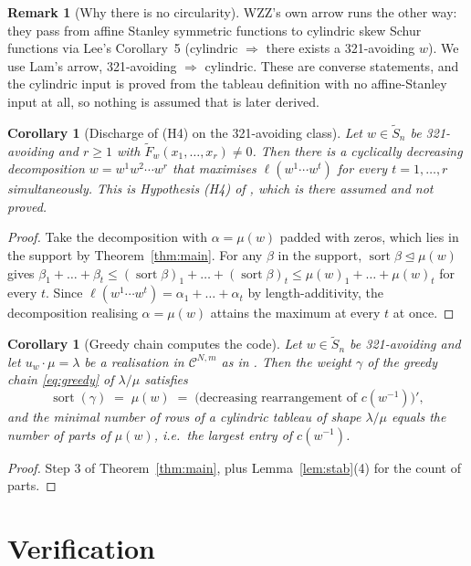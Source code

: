 \documentclass[11pt]{article}
\theoremstyle{plain}
\newtheorem{cor}[thm]{Corollary}
\theoremstyle{definition}
\newtheorem{rem}[thm]{Remark}
\DeclareMathOperator{\sort}{sort}
\newcommand{\Saff}{\widetilde{S}_{n}}
\newcommand{\Fw}{\widetilde{F}_{w}}
\newcommand{\cyl}{\mathcal{C}}
\begin{document}
\begin{rem}[Why there is no circularity]
WZZ's own arrow runs the other way: they pass from affine Stanley symmetric functions to
cylindric skew Schur functions via Lee's Corollary~5 (cylindric $\Rightarrow$ there exists a
321-avoiding $w$). We use Lam's arrow, 321-avoiding $\Rightarrow$ cylindric. These are
converse statements, and the cylindric input \cite{Clio2026} is proved from the tableau
definition with no affine-Stanley input at all, so nothing is assumed that is later derived.
\end{rem}

\begin{cor}[Discharge of (H4) on the 321-avoiding class]\label{cor:h4}
Let $w\in\Saff$ be 321-avoiding and $r\ge1$ with $\Fw(x_1,\dots,x_r)\neq0$. Then there is a
cyclically decreasing decomposition $w=w^1w^2\cdots w^r$ that maximises
$\ell(w^1\cdots w^t)$ for \emph{every} $t=1,\dots,r$ simultaneously. This is
Hypothesis (H4) of \cite[\S5]{Clio2026b}, which is there assumed and not proved.
\end{cor}
\begin{proof}
Take the decomposition with $\alpha=\mu(w)$ padded with zeros, which lies in the support by
Theorem~\ref{thm:main}. For any $\beta$ in the support, $\sort\beta\trianglelefteq\mu(w)$
gives $\beta_1+\dots+\beta_t\le(\sort\beta)_1+\dots+(\sort\beta)_t\le\mu(w)_1+\dots+\mu(w)_t$
for every $t$. Since $\ell(w^1\cdots w^t)=\alpha_1+\dots+\alpha_t$ by length-additivity, the
decomposition realising $\alpha=\mu(w)$ attains the maximum at every $t$ at once.
\end{proof}

\begin{cor}[Greedy chain computes the code]\label{cor:greedycode}
Let $w\in\Saff$ be 321-avoiding and let $u_w\cdot\mu=\lambda$ be a realisation in $\cyl^{N,m}$
as in \cite[\S7]{Lam2006}. Then the weight $\gamma$ of the greedy chain \eqref{eq:greedy} of
$\lambda/\mu$ satisfies
\[
  \sort(\gamma)\;=\;\mu(w)\;=\;\bigl(\text{decreasing rearrangement of }c(w^{-1})\bigr)' ,
\]
and the minimal number of rows of a cylindric tableau of shape $\lambda/\mu$ equals the
number of parts of $\mu(w)$, i.e.\ the largest entry of $c(w^{-1})$.
\end{cor}
\begin{proof}
Step 3 of Theorem~\ref{thm:main}, plus Lemma~\ref{lem:stab}(4) for the count of parts.
\end{proof}

\section{Verification}\label{sec:verify}
\end{document}
